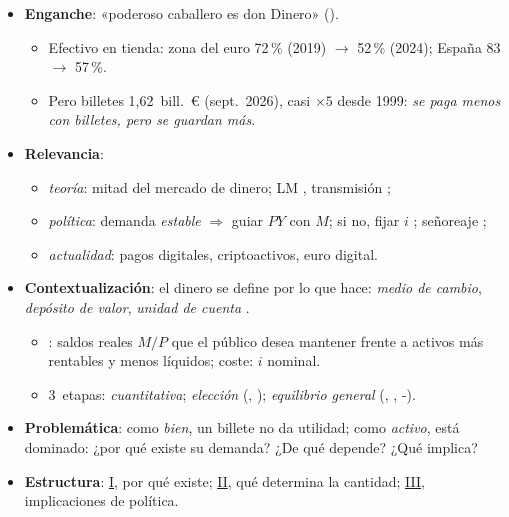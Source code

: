 \documentclass{article}
\begin{document}
\cabecerarepaso
\begin{columnas}

\begin{itemize}
\item \textbf{Enganche}: «poderoso caballero es don Dinero» ().
  \begin{itemize}
  \item Efectivo en tienda: zona del euro 72\,\% (2019) $\to$ 52\,\% (2024); España 83 $\to$ 57\,\%.
  \item Pero billetes 1,62~bill.\ € (sept.\ 2026), casi $\times5$ desde 1999: \emph{se paga menos con billetes, pero se guardan más}.
  \end{itemize}
\item \textbf{Relevancia}:
  \begin{itemize}
  \item \emph{teoría}: mitad del mercado de dinero; LM , transmisión ;
  \item \emph{política}: demanda \emph{estable} $\Rightarrow$ guiar $PY$ con $M$; si no, fijar $i$ ; señoreaje ;
  \item \emph{actualidad}: pagos digitales, criptoactivos, euro digital.
  \end{itemize}
\item \textbf{Contextualización}: el dinero se define por lo que hace: \emph{medio de cambio}, \emph{depósito de valor}, \emph{unidad de cuenta} .
  \begin{itemize}
  \item {}: saldos reales $M/P$ que el público desea mantener frente a activos más rentables y menos líquidos; coste: $i$ nominal.
  \item 3~etapas: \emph{cuantitativa}; \emph{elección} (, ); \emph{equilibrio general} (, , -).
  \end{itemize}
\item \textbf{Problemática}: como \emph{bien}, un billete no da utilidad; como \emph{activo}, está dominado: ¿por qué existe su demanda? ¿De qué depende? ¿Qué implica?
\item \textbf{Estructura}: \hyperref[rep:I]{I}, por qué existe; \hyperref[rep:II]{II}, qué determina la cantidad; \hyperref[rep:III]{III}, implicaciones de política.
\end{itemize}


\end{columnas}
\end{document}
